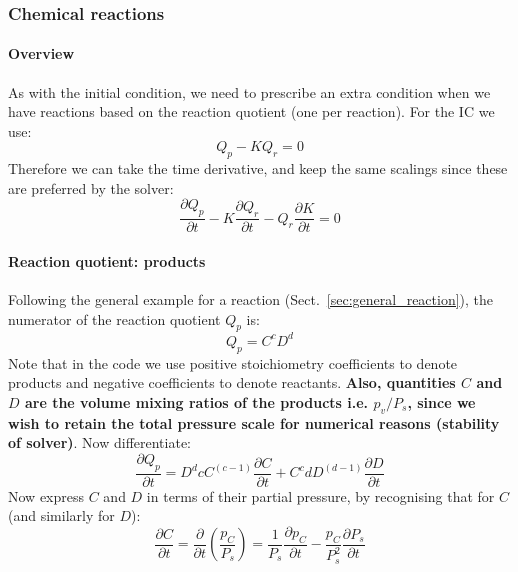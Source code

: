 \subsubsection{Chemical reactions}
\paragraph{Overview}
As with the initial condition, we need to prescribe an extra condition when we have reactions based on the reaction quotient (one per reaction).  For the IC we use:
\begin{equation}
Q_p - K Q_r = 0
\end{equation}
Therefore we can take the time derivative, and keep the same scalings since these are preferred by the solver:
\begin{equation}
\frac{\partial Q_p}{\partial t} - K \frac{\partial Q_r}{\partial t} - Q_r \frac{\partial K}{\partial t} = 0
\end{equation}
\paragraph{Reaction quotient: products}
Following the general example for a reaction (Sect.~\ref{sec:general_reaction}), the numerator of the reaction quotient $Q_p$ is:
\begin{equation}
Q_p = C^c D^d
\end{equation}
Note that in the code we use positive stoichiometry coefficients to denote products and negative coefficients to denote reactants.  \textbf{Also, quantities $C$ and $D$ are the volume mixing ratios of the products i.e. $p_v/P_s$, since we wish to retain the total pressure scale for numerical reasons (stability of solver)}.  Now differentiate:
\begin{equation}
\frac{\partial Q_p}{\partial t} = D^d c C^{(c-1)} \frac{\partial C}{\partial t} + C^c d D^{(d-1)} \frac{\partial D}{\partial t}
\end{equation}
Now express $C$ and $D$ in terms of their partial pressure, by recognising that for $C$ (and similarly for $D$):
\begin{equation}
\frac{\partial C}{\partial t} = \frac{\partial}{\partial t} \left( \frac{p_C}{P_s} \right) = \frac{1}{P_s} \frac{\partial p_C}{\partial t} - \frac{p_C}{P_s^2} \frac{\partial P_s}{\partial t}
\end{equation}
